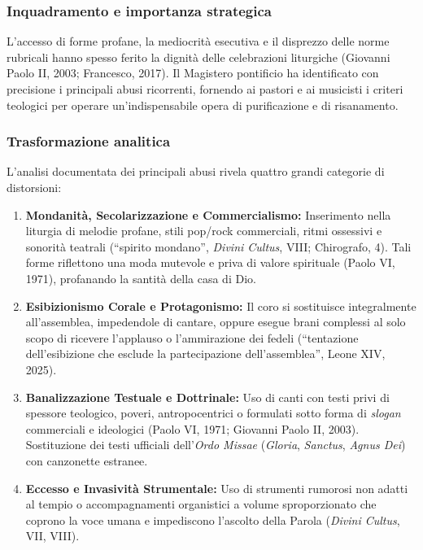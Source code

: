 \documentclass[12pt,a4paper]{article}
\begin{document}
	\subsubsection{Inquadramento e importanza strategica}\label{inquadramento-e-importanza-strategica-13}
	
	L'accesso di forme profane, la mediocrità esecutiva e il disprezzo delle norme rubricali hanno spesso ferito la dignità delle celebrazioni liturgiche (Giovanni Paolo II, 2003; Francesco, 2017). Il Magistero pontificio ha identificato con precisione i principali abusi ricorrenti, fornendo ai pastori e ai musicisti i criteri teologici per operare un'indispensabile opera di purificazione e di risanamento.
	
	\subsubsection{Trasformazione analitica}\label{trasformazione-analitica-14}
	
	L'analisi documentata dei principali abusi rivela quattro grandi categorie di distorsioni:
	
	\begin{enumerate}[label=\arabic*.,leftmargin=*]
		\item \textbf{Mondanità, Secolarizzazione e Commercialismo:} Inserimento nella liturgia di melodie profane, stili pop/rock commerciali, ritmi ossessivi e sonorità teatrali (``spirito mondano'', \emph{Divini Cultus}, VIII; Chirografo, 4). Tali forme riflettono una moda mutevole e priva di valore spirituale (Paolo VI, 1971), profanando la santità della casa di Dio.
		\item \textbf{Esibizionismo Corale e Protagonismo:} Il coro si sostituisce integralmente all'assemblea, impedendole di cantare, oppure esegue brani complessi al solo scopo di ricevere l'applauso o l'ammirazione dei fedeli (``tentazione dell'esibizione che esclude la partecipazione dell'assemblea'', Leone XIV, 2025).
		\item \textbf{Banalizzazione Testuale e Dottrinale:} Uso di canti con testi privi di spessore teologico, poveri, antropocentrici o formulati sotto forma di \emph{slogan} commerciali e ideologici (Paolo VI, 1971; Giovanni Paolo II, 2003). Sostituzione dei testi ufficiali dell'\emph{Ordo Missae} (\emph{Gloria}, \emph{Sanctus}, \emph{Agnus Dei}) con canzonette estranee.
		\item \textbf{Eccesso e Invasività Strumentale:} Uso di strumenti rumorosi non adatti al tempio o accompagnamenti organistici a volume sproporzionato che coprono la voce umana e impediscono l'ascolto della Parola (\emph{Divini Cultus}, VII, VIII).
	\end{enumerate}
	
\end{document}

